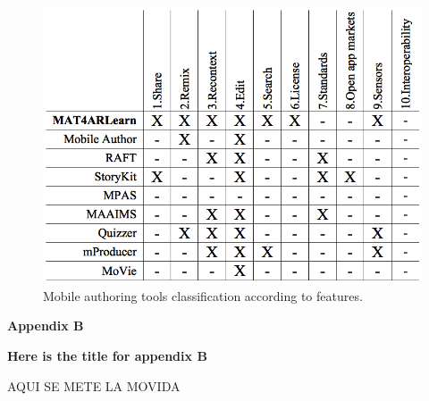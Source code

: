 \begin{small}


\begin{figure}[H]
	\includegraphics[width=1\linewidth]{img/table3}
	\caption{Mobile authoring tools classification according to features.}
	\label{table3} 
\end{figure}



\end{small}



\clearpage{\pagestyle{empty}\cleardoublepage}

\begin{Large}
\textbf{Appendix B} 
\end{Large}
\vspace{3em}

\textbf{Here is the title for appendix B}

\begin{small}

AQUI SE METE LA MOVIDA

\end{small}



\clearpage{\pagestyle{empty}\cleardoublepage}
